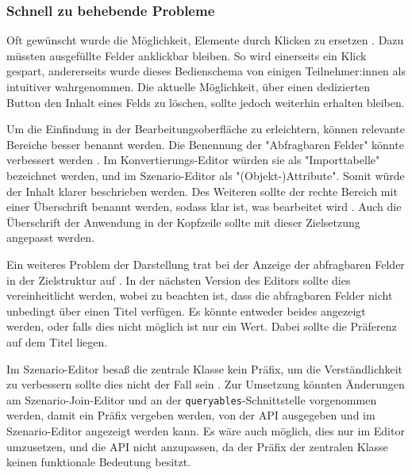 
\subsubsection{Schnell zu behebende Probleme}

Oft gewünscht wurde die Möglichkeit, Elemente durch Klicken zu ersetzen . Dazu müssten ausgefüllte Felder anklickbar bleiben. So wird einerseits ein Klick gespart, andererseits wurde dieses Bedienschema von einigen Teilnehmer:innen als intuitiver wahrgenommen. Die aktuelle Möglichkeit, über einen dedizierten Button den Inhalt eines Felds zu löschen, sollte jedoch weiterhin erhalten bleiben.

Um die Einfindung in der Bearbeitungsoberfläche zu erleichtern, können relevante Bereiche besser benannt werden. Die Benennung der "Abfragbaren Felder" könnte verbessert werden . Im Konvertierungs-Editor würden sie als "Importtabelle" bezeichnet werden, und im Szenario-Editor als "(Objekt-)Attribute". Somit würde der Inhalt klarer beschrieben werden. Des Weiteren sollte der rechte Bereich mit einer Überschrift benannt werden, sodass klar ist, was bearbeitet wird . Auch die Überschrift der Anwendung in der Kopfzeile sollte mit dieser Zielsetzung angepasst werden.

Ein weiteres Problem der Darstellung trat bei der Anzeige der abfragbaren Felder in der Zielstruktur auf . In der nächsten Version des Editors sollte dies vereinheitlicht werden, wobei zu beachten ist, dass die abfragbaren Felder nicht unbedingt über einen Titel verfügen. Es könnte entweder beides angezeigt werden, oder falls dies nicht möglich ist nur ein Wert. Dabei sollte die Präferenz auf dem Titel liegen.

Im Szenario-Editor besaß die zentrale Klasse kein Präfix, um die Verständlichkeit zu verbessern sollte dies nicht der Fall sein . Zur Umsetzung könnten Änderungen am Szenario-Join-Editor und an der \texttt{queryables}-Schnittstelle vorgenommen werden, damit ein Präfix vergeben werden, von der \ac{API} ausgegeben und im Szenario-Editor angezeigt werden kann. Es wäre auch möglich, dies nur im Editor umzusetzen, und die \ac{API} nicht anzupassen, da der Präfix der zentralen Klasse keinen funktionale Bedeutung besitzt.

